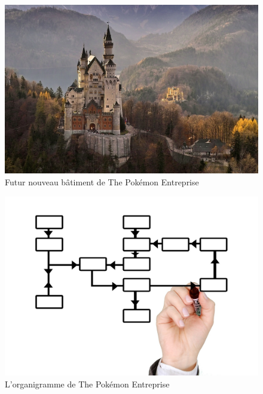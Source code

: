\documentclass[../main.tex]{subfiles}
\begin{document}

\begin{figure}[h]
  \centering
  \includegraphics[width=\textwidth,height=0.4\textheight,keepaspectratio]{images/photos/batiment}
  \captionsetup{font=small,labelfont=bf, justification=centering}
  \caption{Futur nouveau bâtiment de The Pokémon Entreprise}
  \label{fig:batiment}
\end{figure}

\begin{figure}[h]
  \centering
  \includegraphics[width=\textwidth,height=0.4\textheight,keepaspectratio]{images/organigrammes/organigramme}
  \captionsetup{font=small,labelfont=bf, justification=centering}
  \caption{L'organigramme de The Pokémon Entreprise}
  \label{fig:organigramme}
\end{figure}
\end{document}
